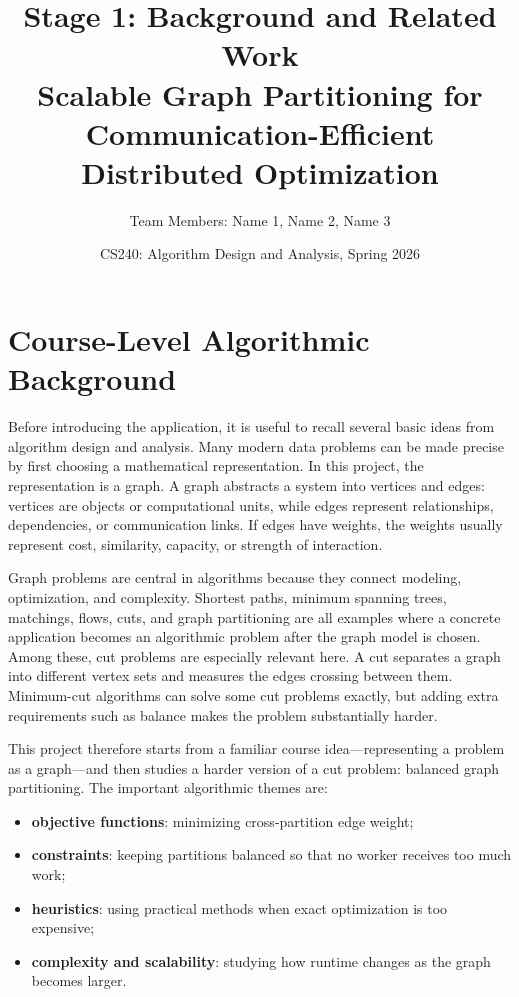 \documentclass[11pt]{article}
\title{\textbf{Stage 1: Background and Related Work}\\
Scalable Graph Partitioning for Communication-Efficient Distributed Optimization}
\author{Team Members: Name 1, Name 2, Name 3}
\date{CS240: Algorithm Design and Analysis, Spring 2026}
\begin{document}
\maketitle

\section{Course-Level Algorithmic Background}

Before introducing the application, it is useful to recall several basic ideas
from algorithm design and analysis. Many modern data problems can be made
precise by first choosing a mathematical representation. In this project, the
representation is a graph. A graph abstracts a system into vertices and edges:
vertices are objects or computational units, while edges represent
relationships, dependencies, or communication links. If edges have weights, the
weights usually represent cost, similarity, capacity, or strength of
interaction.

Graph problems are central in algorithms because they connect modeling,
optimization, and complexity. Shortest paths, minimum spanning trees, matchings,
flows, cuts, and graph partitioning are all examples where a concrete
application becomes an algorithmic problem after the graph model is chosen.
Among these, cut problems are especially relevant here. A cut separates a graph
into different vertex sets and measures the edges crossing between them.
Minimum-cut algorithms can solve some cut problems exactly, but adding extra
requirements such as balance makes the problem substantially harder.

This project therefore starts from a familiar course idea---representing a
problem as a graph---and then studies a harder version of a cut problem:
balanced graph partitioning. The important algorithmic themes are:
\begin{itemize}
    \item \textbf{objective functions}: minimizing cross-partition edge weight;
    \item \textbf{constraints}: keeping partitions balanced so that no worker
    receives too much work;
    \item \textbf{heuristics}: using practical methods when exact optimization
    is too expensive;
    \item \textbf{complexity and scalability}: studying how runtime changes as
    the graph becomes larger.
\end{itemize}
\end{document}

